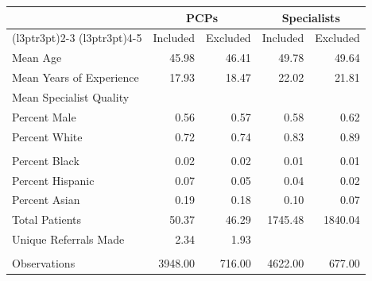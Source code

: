 
\begin{tabular}{lrrrr}
\toprule
\multicolumn{1}{c}{ } & \multicolumn{2}{c}{PCPs} & \multicolumn{2}{c}{Specialists} \\
\cmidrule(l{3pt}r{3pt}){2-3} \cmidrule(l{3pt}r{3pt}){4-5}
  & Included & Excluded & Included & Excluded\\
\midrule
Mean Age & 45.98 & 46.41 & 49.78 & 49.64\\
Mean Years of Experience & 17.93 & 18.47 & 22.02 & 21.81\\
Mean Specialist Quality &  &  &  & \\
Percent Male & 0.56 & 0.57 & 0.58 & 0.62\\
Percent White & 0.72 & 0.74 & 0.83 & 0.89\\
\addlinespace\\
Percent Black & 0.02 & 0.02 & 0.01 & 0.01\\
Percent Hispanic & 0.07 & 0.05 & 0.04 & 0.02\\
Percent Asian & 0.19 & 0.18 & 0.10 & 0.07\\
Total Patients & 50.37 & 46.29 & 1745.48 & 1840.04\\
Unique Referrals Made & 2.34 & 1.93 &  & \\
\addlinespace\\
Observations & 3948.00 & 716.00 & 4622.00 & 677.00\\
\bottomrule
\end{tabular}
